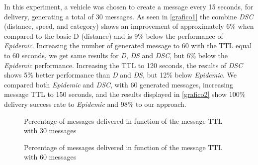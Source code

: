\documentclass[letterpaper, 10 pt, conference]{ieeeconf}  %
\begin{document}
In this experiment, a vehicle was chosen to create a message every 15 seconds, for delivery, generating a total of 30 messages.
As seen in \autoref{grafico1} the combine \emph{DSC} (distance, speed, and category) shows an improvement of approximately 6\% when compared to the basic D (distance) and is 9\% below the performance of \emph{Epidemic}. Increasing the number of generated message to 60 with the TTL equal to 60 seconds, we get same results for \emph{D}, \emph{DS} and \emph{DSC}, but 6\% below the \emph{Epidemic} performance. Increasing the TTL to 120 seconds, the results of \emph{DSC} shows 5\% better performance than \emph{D} and \emph{DS}, but 12\% below \emph{Epidemic}. We compared both \emph{Epidemic} and \emph{DSC}, with 60 generated messages, increasing message TTL to 150 seconds, and the results displayed in \autoref{grafico2} show 100\% delivery success rate to \emph{Epidemic} and 98\% to our approach.

\begin{figure}[thpb]
    \center
    \caption{Percentage of messages delivered in function of the message TTL with 30 messages} \label{grafico1}
\end{figure}

\begin{figure}[thpb]
    \center
    \caption{Percentage of messages delivered in function of the message TTL with 60 messages} \label{grafico2}
\end{figure}
\end{document}

